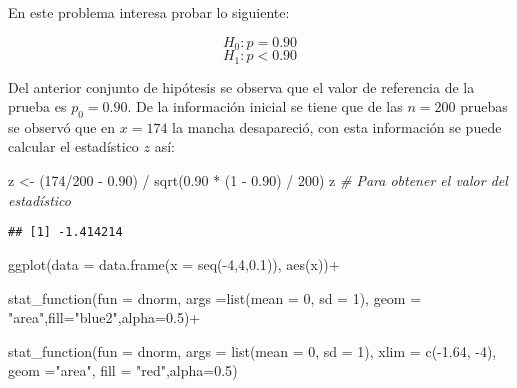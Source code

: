 \documentclass[
]{article}
\newenvironment{Shaded}{}{}
\newcommand{\AttributeTok}[1]{\textcolor[rgb]{0.49,0.56,0.16}{#1}}
\newcommand{\CommentTok}[1]{\textcolor[rgb]{0.38,0.63,0.69}{\textit{#1}}}
\newcommand{\DecValTok}[1]{\textcolor[rgb]{0.25,0.63,0.44}{#1}}
\newcommand{\FloatTok}[1]{\textcolor[rgb]{0.25,0.63,0.44}{#1}}
\newcommand{\FunctionTok}[1]{\textcolor[rgb]{0.02,0.16,0.49}{#1}}
\newcommand{\NormalTok}[1]{#1}
\newcommand{\OtherTok}[1]{\textcolor[rgb]{0.00,0.44,0.13}{#1}}
\newcommand{\SpecialCharTok}[1]{\textcolor[rgb]{0.25,0.44,0.63}{#1}}
\newcommand{\StringTok}[1]{\textcolor[rgb]{0.25,0.44,0.63}{#1}}
\begin{document}
En este problema interesa probar lo siguiente:

\[H_0: p = 0.90\] \[H_1: p < 0.90\]

Del anterior conjunto de hipótesis se observa que el valor de referencia
de la prueba es \(p_0=0.90\). De la información inicial se tiene que de
las \(n=200\) pruebas se observó que en \(x=174\) la mancha desapareció,
con esta información se puede calcular el estadístico \(z\) así:

\begin{Shaded}
\begin{Highlighting}[]
\NormalTok{z }\OtherTok{\textless{}{-}}\NormalTok{ (}\DecValTok{174}\SpecialCharTok{/}\DecValTok{200} \SpecialCharTok{{-}} \FloatTok{0.90}\NormalTok{) }\SpecialCharTok{/} \FunctionTok{sqrt}\NormalTok{(}\FloatTok{0.90} \SpecialCharTok{*}\NormalTok{ (}\DecValTok{1} \SpecialCharTok{{-}} \FloatTok{0.90}\NormalTok{) }\SpecialCharTok{/} \DecValTok{200}\NormalTok{)}
\NormalTok{z  }\CommentTok{\# Para obtener el valor del estadístico}
\end{Highlighting}
\end{Shaded}

\begin{verbatim}
## [1] -1.414214
\end{verbatim}

\begin{Shaded}
\begin{Highlighting}[]
\FunctionTok{ggplot}\NormalTok{(}\AttributeTok{data =} \FunctionTok{data.frame}\NormalTok{(}\AttributeTok{x =} \FunctionTok{seq}\NormalTok{(}\SpecialCharTok{{-}}\DecValTok{4}\NormalTok{,}\DecValTok{4}\NormalTok{,}\FloatTok{0.1}\NormalTok{)), }\FunctionTok{aes}\NormalTok{(x))}\SpecialCharTok{+}
 
  \FunctionTok{stat\_function}\NormalTok{(}\AttributeTok{fun =}\NormalTok{ dnorm, }\AttributeTok{args =}\FunctionTok{list}\NormalTok{(}\AttributeTok{mean =} \DecValTok{0}\NormalTok{, }\AttributeTok{sd =} \DecValTok{1}\NormalTok{),}
                \AttributeTok{geom =} \StringTok{"area"}\NormalTok{,}\AttributeTok{fill=}\StringTok{"blue2"}\NormalTok{,}\AttributeTok{alpha=}\FloatTok{0.5}\NormalTok{)}\SpecialCharTok{+}

  \FunctionTok{stat\_function}\NormalTok{(}\AttributeTok{fun =}\NormalTok{ dnorm, }\AttributeTok{args =} \FunctionTok{list}\NormalTok{(}\AttributeTok{mean =} \DecValTok{0}\NormalTok{, }\AttributeTok{sd =} \DecValTok{1}\NormalTok{), }\AttributeTok{xlim =} \FunctionTok{c}\NormalTok{(}\SpecialCharTok{{-}}\FloatTok{1.64}\NormalTok{, }\SpecialCharTok{{-}}\DecValTok{4}\NormalTok{),}
                \AttributeTok{geom =}\StringTok{"area"}\NormalTok{, }\AttributeTok{fill =} \StringTok{"red"}\NormalTok{,}\AttributeTok{alpha=}\FloatTok{0.5}\NormalTok{)}
\end{Highlighting}
\end{Shaded}
\end{document}
